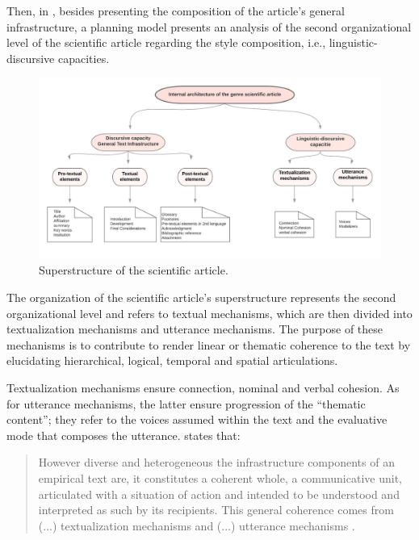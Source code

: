 \documentclass[english]{textolivre}
\begin{document}
Then, in , besides presenting the composition of the article’s general infrastructure, a planning model presents an analysis of the second organizational level of the scientific article regarding the style composition, i.e., linguistic-discursive capacities.

\begin{figure}[htbp]
 \centering
 \includegraphics[width=\textwidth]{Fig2.png}
 \caption{Superstructure of the scientific article.}
 \label{fig-02}
\end{figure}

The organization of the scientific article’s superstructure represents the second organizational level and refers to textual mechanisms, which are then divided into textualization mechanisms and utterance mechanisms. The purpose of these mechanisms is to contribute to render linear or thematic coherence to the text by elucidating hierarchical, logical, temporal and spatial articulations.

Textualization mechanisms ensure connection, nominal and verbal cohesion. As for utterance mechanisms, the latter ensure progression of the “thematic content”; they refer to the voices assumed within the text and the evaluative mode that composes the utterance. \textcite{bronckart_atividade_1999} states that:

\begin{quote}
    However diverse and heterogeneous the infrastructure components of an empirical text are, it constitutes a coherent whole, a communicative unit, articulated with a situation of action and intended to be understood and interpreted as such by its recipients. This general coherence comes from (...) textualization mechanisms and (...) utterance mechanisms \cite[p. 259]{bronckart_atividade_1999}.
\end{quote}
\end{document}
